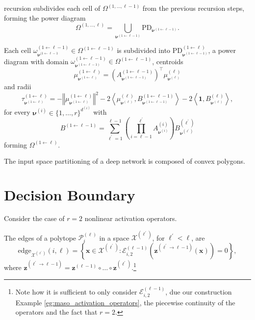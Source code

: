  recursion subdivides each cell of $\Omega^{(1,\dots,\ell-1)}$ from the previous recursion steps, forming the power diagram $$\Omega^{(1,\dots,\ell)}=\bigcup_{\boldsymbol{\nu}^{(1\leftarrow\ell-1)}}\mathrm{PD}_{\boldsymbol{\nu}^{(1\leftarrow\ell-1)}}.$$

\begin{theorem}
    Each cell $\omega_{\boldsymbol{\nu}^{(1\leftarrow\ell-1}}^{(1\leftarrow\ell-1)}\in\Omega^{(1\leftarrow\ell-1)}$ is subdivided into $\mathrm{PD}^{(1\leftarrow\ell)}_{\boldsymbol{\nu}^{(1\leftarrow\ell-1)}}$, a power diagram with domain $\omega_{\boldsymbol{\nu}^{(1\leftarrow\ell-1)}}^{(1\leftarrow\ell-1)}\in\Omega^{(1\leftarrow\ell-1)}$, centroids $$\mu_{\boldsymbol{\nu}^{(1\leftarrow\ell)}}^{(1\leftarrow\ell)}=\left(A_{\boldsymbol{\nu}^{(1\leftarrow\ell-1)}}^{(1\leftarrow\ell-1)}\right)^\top\mu_{\boldsymbol{\nu}^{(\ell)}}^{(\ell)}$$and radii $$\tau_{\boldsymbol{\nu}^{(1\leftarrow\ell)}}^{(1\leftarrow\ell)}=-\left\Vert\mu_{\boldsymbol{\nu}^{(1\leftarrow\ell)}}^{(1\leftarrow\ell)}\right\Vert^2-2\left\langle\mu_{\boldsymbol{\nu}^{(\ell)}}^{(\ell)},B_{\boldsymbol{\nu}^{(1\leftarrow\ell-1)}}^{(1\leftarrow\ell-1)}\right\rangle-2\left\langle\mathbf{1},B_{\boldsymbol{\nu}^{(\ell)}}^{(\ell)}\right\rangle,$$for every $\boldsymbol{\nu}^{(i)}\in\{1,\dots,r\}^{d^{(i)}}$ with $$B^{(1\leftarrow\ell-1)}=\sum_{\ell^\prime=1}^{\ell-1}\left(\prod_{i=\ell-1}^{\ell^\prime}A_{\boldsymbol{\nu}^{(i)}}^{(i)}\right)B_{\boldsymbol{\nu}^{\left(\ell^\prime\right)}}^{\left(\ell^\prime\right)}$$forming $\Omega^{(1\leftarrow\ell)}$.
\end{theorem}

\begin{corollary}\label{cor:deep_network_layer_convex_polytopes}
    The input space partitioning of a deep network is composed of convex polygons.
\end{corollary}

\section{Decision Boundary}

Consider the case of $r=2$ nonlinear activation operators. 

\begin{definition}
    The edges of a polytope $\mathcal{P}_i^{(\ell)}$ in a space $\mathcal{X}^{\left(\ell^\prime\right)}$, for $\ell^\prime<\ell$, are $$\mathrm{edge}_{\mathcal{X}^{\left(\ell^\prime\right)}}(i,\ell)=\left\{\mathbf{x}\in\mathcal{X}^{\left(\ell^\prime\right)}:\mathcal{E}_{i,2}^{(\ell-1)}\left(\mathbf{z}^{\left(\ell^\prime\to\ell-1\right)}(\mathbf{x})\right)=0\right\},$$where $\mathbf{z}^{\left(\ell^\prime\to\ell-1\right)}=\mathbf{z}^{(\ell-1)}\circ\dots\circ\mathbf{z}^{\left(\ell^\prime\right)}$.\footnote{Note how it is sufficient to only consider $\mathcal{E}_{i,2}^{(\ell-1)}$, due our construction Example \ref{eg:maso_activation_operators}, the piecewise continuity of the operators and the fact that $r=2$.}
\end{definition}

